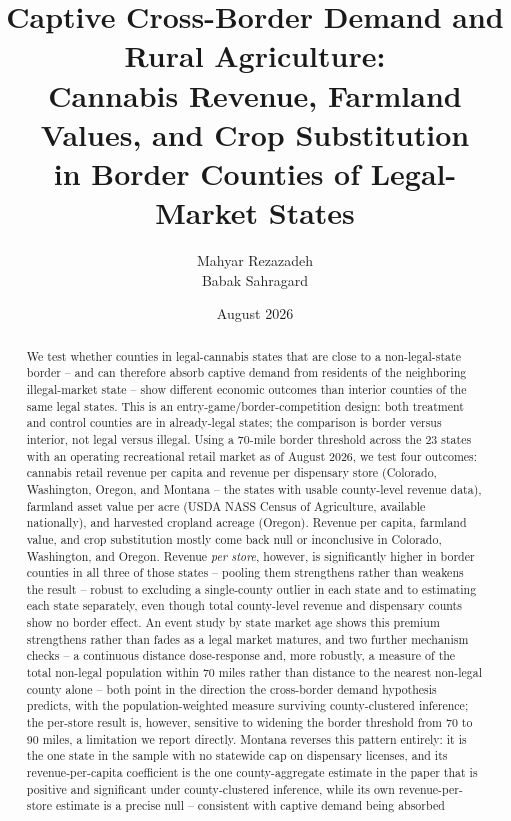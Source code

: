 ﻿\documentclass{article}
\title{Captive Cross-Border Demand and Rural Agriculture:\\
Cannabis Revenue, Farmland Values, and Crop Substitution\\
in Border Counties of Legal-Market States}
\author{Mahyar Rezazadeh \\ Babak Sahragard}
\date{August 2026}
\begin{document}
\maketitle

\begin{abstract}
\noindent We test whether counties in legal-cannabis states that are close to a non-legal-state border --
and can therefore absorb captive demand from residents of the neighboring illegal-market state --
show different economic outcomes than interior counties of the same legal states. This is an
entry-game/border-competition design: both treatment and control counties are in already-legal states;
the comparison is border versus interior, not legal versus illegal. Using a 70-mile border threshold
across the 23 states with an operating recreational retail market as of August 2026, we test four
outcomes: cannabis retail revenue per capita and revenue per dispensary store (Colorado, Washington,
Oregon, and Montana -- the states with usable county-level revenue data), farmland asset value per acre
(USDA NASS Census of Agriculture, available nationally), and harvested cropland acreage (Oregon). Revenue
per capita, farmland value, and crop substitution mostly come back null or inconclusive in Colorado,
Washington, and Oregon. Revenue \emph{per store}, however, is significantly higher in border counties in
all three of those states -- pooling them strengthens rather than weakens the result -- robust to excluding
a single-county outlier in each state and to estimating each state separately, even though total
county-level revenue and dispensary counts show no border effect. An event study by state market age shows
this premium strengthens rather than fades as a legal market matures, and two further mechanism checks --
a continuous distance dose-response and, more robustly, a measure of the total non-legal population within
70 miles rather than distance to the nearest non-legal county alone -- both point in the direction the
cross-border demand hypothesis predicts, with the population-weighted measure surviving county-clustered
inference; the per-store result is, however, sensitive to widening the border threshold from 70 to 90
miles, a limitation we report directly. Montana reverses this pattern entirely: it is the one state in the
sample with no statewide cap on dispensary licenses, and its revenue-per-capita coefficient is the one
county-aggregate estimate in the paper that is positive and significant under county-clustered inference,
while its own revenue-per-store estimate is a precise null -- consistent with captive demand being absorbed

\end{abstract}
\end{document}
